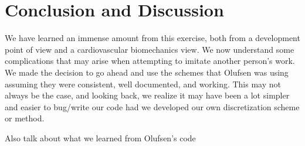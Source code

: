 \documentclass[12pt]{article}
\begin{document}
\section{Conclusion and Discussion}
We have learned an immense amount from this exercise, both from a development point of view and a cardiovascular biomechanics view. We now understand some complications that may arise when attempting to imitate another person's work. We made the decision to go ahead and use the schemes that Olufsen was using assuming they were consistent, well documented, and working. This may not always be the case, and looking back, we realize it may have been a lot simpler and easier to bug/write our code had we developed our own discretization scheme or method. 

Also talk about what we learned from Olufsen's code



\end{document}
